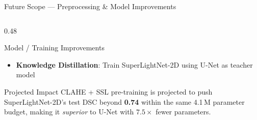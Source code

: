 \documentclass[aspectratio=169,10pt]{beamer}
\begin{document}
\begin{frame}{Future Scope --- Preprocessing \& Model Improvements}
\begin{columns}[T]
\begin{column}{0.48\textwidth}
\begin{block}{Model / Training Improvements}
\begin{itemize}
          \item \textbf{Knowledge Distillation}: Train SuperLightNet-2D using U-Net as teacher model
        \end{itemize}
      \end{block}
      \vspace{4pt}
      \begin{exampleblock}{Projected Impact}
        CLAHE + SSL pre-training is projected to push SuperLightNet-2D's
        test DSC beyond \textbf{0.74} within the same 4.1\,M parameter budget,
        making it \textit{superior} to U-Net with $7.5\times$ fewer parameters.
      \end{exampleblock}
    \end{column}
  \end{columns}
\end{frame}
\end{document}
